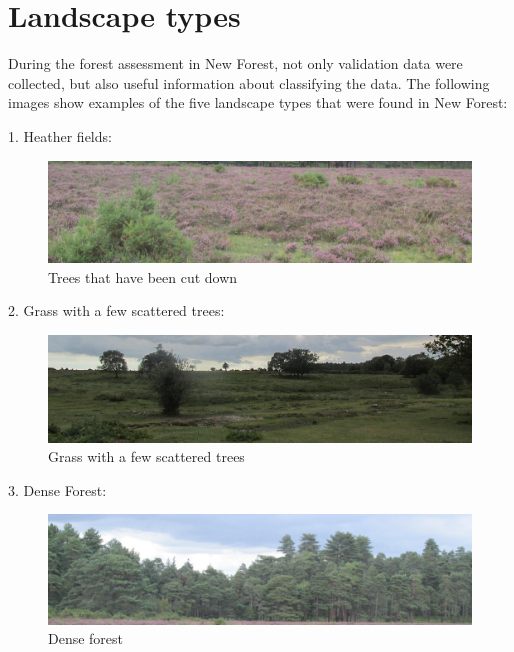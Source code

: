 \documentclass{subfiles}
\begin{document}
   \newpage
\section{	Landscape types}
	During the forest assessment in New Forest, not only validation data were collected, but also useful information about classifying the data. The following images show examples of the five landscape types that were found in New Forest:
	
	1.	Heather fields:
    
      \begin{figure} [!h]
      	\centering
      	\includegraphics[width=\textwidth]{img/NewForest/LT_HeatherFields}
      	\caption{Trees that have been cut down}
      	\label{fig:LT_HeatherFields}
      \end{figure}

    
    2.	Grass with a few scattered trees:
          \begin{figure} [!h]
          	\centering
          	\includegraphics[width=\textwidth]{img/NewForest/LT_GrassWithFewTrees}
          	\caption{Grass with a few scattered trees}
          	\label{fig:LT_GrassWithFewTrees}
          \end{figure}

    3.	Dense Forest:
          \begin{figure} [!h]
          	\centering
          	\includegraphics[width=\textwidth]{img/NewForest/LT_DenseForest}
          	\caption{Dense forest}
          	\label{fig:LT_DenseForest}
          \end{figure}
          
\end{document}
